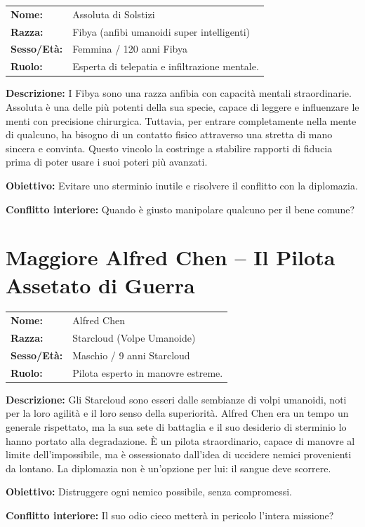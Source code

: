 \documentclass[11pt,a4paper]{article}
\begin{document}
\begin{tcolorbox}[colback=mininglightorange!20, colframe=miningorange]
\begin{tabularx}{\textwidth}{lX}
\textbf{Nome:} & Assoluta di Solstizi \\
\textbf{Razza:} & Fibya (anfibi umanoidi super intelligenti) \\
\textbf{Sesso/Età:} & Femmina / 120 anni Fibya \\
\textbf{Ruolo:} & Esperta di telepatia e infiltrazione mentale. \\
\end{tabularx}

\textbf{Descrizione:} I Fibya sono una razza anfibia con capacità mentali straordinarie. Assoluta è una delle più potenti della sua specie, capace di leggere e influenzare le menti con precisione chirurgica. Tuttavia, per entrare completamente nella mente di qualcuno, ha bisogno di un contatto fisico attraverso una stretta di mano sincera e convinta. Questo vincolo la costringe a stabilire rapporti di fiducia prima di poter usare i suoi poteri più avanzati.


\textbf{Obiettivo:} Evitare uno sterminio inutile e risolvere il conflitto con la diplomazia.

\textbf{Conflitto interiore:} Quando è giusto manipolare qualcuno per il bene comune?
\end{tcolorbox}



\section{Maggiore Alfred Chen – Il Pilota Assetato di Guerra}

\begin{tcolorbox}[colback=mininglightorange!20, colframe=miningorange]
\begin{tabularx}{\textwidth}{lX}
\textbf{Nome:} & Alfred Chen \\
\textbf{Razza:} & Starcloud (Volpe Umanoide) \\
\textbf{Sesso/Età:} & Maschio / 9 anni Starcloud \\
\textbf{Ruolo:} & Pilota esperto in manovre estreme. \\
\end{tabularx}

\textbf{Descrizione:} Gli Starcloud sono esseri dalle sembianze di volpi umanoidi, noti per la loro agilità e il loro senso della superiorità. Alfred Chen era un tempo un generale rispettato, ma la sua sete di battaglia e il suo desiderio di sterminio lo hanno portato alla degradazione. È un pilota straordinario, capace di manovre al limite dell’impossibile, ma è ossessionato dall’idea di uccidere nemici provenienti da lontano. La diplomazia non è un’opzione per lui: il sangue deve scorrere.


\textbf{Obiettivo:} Distruggere ogni nemico possibile, senza compromessi.

\textbf{Conflitto interiore:} Il suo odio cieco metterà in pericolo l’intera missione?
\end{tcolorbox}
\end{document}
